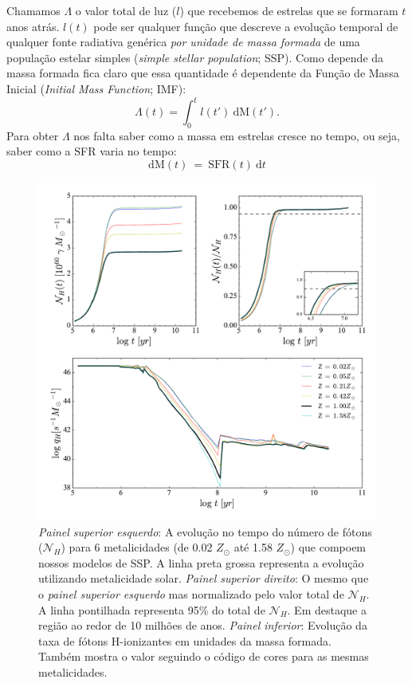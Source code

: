 Chamamos $\Lambda$ o valor total de luz ($l$) que recebemos de estrelas que se formaram $t$ anos atrás. $l(t)$ pode ser qualquer função que descreve a evolução temporal de qualquer fonte radiativa genérica \emph{por unidade de massa formada} de uma população estelar simples ({\em simple stellar population}; SSP). Como depende da massa formada fica claro que essa quantidade é dependente da Função de Massa Inicial ({\em Initial Mass Function}; IMF):
\begin{equation}
	\Lambda(t) = \int_0^t l(t')\ \textrm{d}\textrm{M}(t').
	\label{eq:dLambda}
\end{equation}
\noindent Para obter $\Lambda$ nos falta saber como a massa em estrelas cresce no tempo, ou seja, saber como a SFR varia no tempo:
\begin{equation}
	\mathrm{d}\mathrm{M}(t)\ =\ \mathrm{SFR}(t)\ \mathrm{d}t
	\label{eq:dM_t}
\end{equation}

\begin{figure}
	\centering
	\includegraphics[scale=0.62]{figuras/Nh_logt_metBase_Padova2000_salp.pdf}
	\caption[Evolução temporal do número e da taxa de fótons H-ionizantes em unidades da massa
	formada.]
	{\emph{Painel superior esquerdo}: A	evolução no tempo do número de fótons ($\mathcal{N}_H$) para 6
metalicidades (de 0.02 $Z_\odot$ até 1.58 $Z_\odot$) que compoem nossos modelos de SSP. A linha
preta grossa representa a evolução utilizando metalicidade solar. \emph{Painel superior direito}:
O mesmo que o \emph{painel superior esquerdo} mas normalizado pelo valor total de $\mathcal{N}_H$.
A linha pontilhada representa 95\% do total de $\mathcal{N}_H$. Em destaque a região ao redor de 10
milhões de anos. \emph{Painel inferior}: Evolução da taxa de fótons H-ionizantes em unidades da
massa formada.
Também mostra o valor seguindo o código de cores para as mesmas metalicidades.}
	\label{fig:Nh_qh}
\end{figure}

